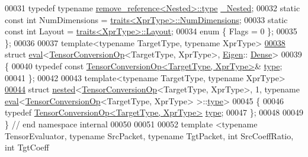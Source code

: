 \begin{DoxyCode}
00031   \textcolor{keyword}{typedef} \textcolor{keyword}{typename} \hyperlink{group___sparse_core___module}{remove\_reference<Nested>::type} 
      \hyperlink{group___sparse_core___module}{\_Nested};
00032   \textcolor{keyword}{static} \textcolor{keyword}{const} \textcolor{keywordtype}{int} NumDimensions = \hyperlink{struct_eigen_1_1internal_1_1traits}{traits<XprType>::NumDimensions};
00033   \textcolor{keyword}{static} \textcolor{keyword}{const} \textcolor{keywordtype}{int} Layout = \hyperlink{struct_eigen_1_1internal_1_1traits}{traits<XprType>::Layout};
00034   \textcolor{keyword}{enum} \{ Flags = 0 \};
00035 \};
00036 
00037 \textcolor{keyword}{template}<\textcolor{keyword}{typename} TargetType, \textcolor{keyword}{typename} XprType>
\hyperlink{struct_eigen_1_1internal_1_1eval_3_01_tensor_conversion_op_3_01_target_type_00_01_xpr_type_01_4_00_01_eigen_1_1_dense_01_4}{00038} \textcolor{keyword}{struct }\hyperlink{struct_eigen_1_1internal_1_1eval}{eval}<\hyperlink{class_eigen_1_1_tensor_conversion_op}{TensorConversionOp}<TargetType, XprType>, \hyperlink{namespace_eigen}{Eigen}::
      \hyperlink{struct_eigen_1_1_dense}{Dense}>
00039 \{
00040   \textcolor{keyword}{typedef} \textcolor{keyword}{const} \hyperlink{class_eigen_1_1_tensor_conversion_op}{TensorConversionOp<TargetType, XprType>}& 
      \hyperlink{class_eigen_1_1_tensor_conversion_op}{type};
00041 \};
00042 
00043 \textcolor{keyword}{template}<\textcolor{keyword}{typename} TargetType, \textcolor{keyword}{typename} XprType>
\hyperlink{struct_eigen_1_1internal_1_1nested_3_01_tensor_conversion_op_3_01_target_type_00_01_xpr_type_01_b83af6d243a47c048dc01ffbe6156814}{00044} \textcolor{keyword}{struct }\hyperlink{struct_eigen_1_1internal_1_1nested}{nested}<\hyperlink{class_eigen_1_1_tensor_conversion_op}{TensorConversionOp}<TargetType, XprType>, 1, typename 
      \hyperlink{struct_eigen_1_1internal_1_1eval}{eval}<\hyperlink{class_eigen_1_1_tensor_conversion_op}{TensorConversionOp}<TargetType, XprType> >::\hyperlink{class_eigen_1_1_tensor_conversion_op}{type}>
00045 \{
00046   \textcolor{keyword}{typedef} \hyperlink{class_eigen_1_1_tensor_conversion_op}{TensorConversionOp<TargetType, XprType>} 
      \hyperlink{class_eigen_1_1_tensor_conversion_op}{type};
00047 \};
00048 
00049 \}  \textcolor{comment}{// end namespace internal}
00050 
00051 
00052 \textcolor{keyword}{template} <\textcolor{keyword}{typename} TensorEvaluator, \textcolor{keyword}{typename} SrcPacket, \textcolor{keyword}{typename} TgtPacket, \textcolor{keywordtype}{int} SrcCoeffRatio, \textcolor{keywordtype}{int} TgtCoeff

\end{DoxyCode}
